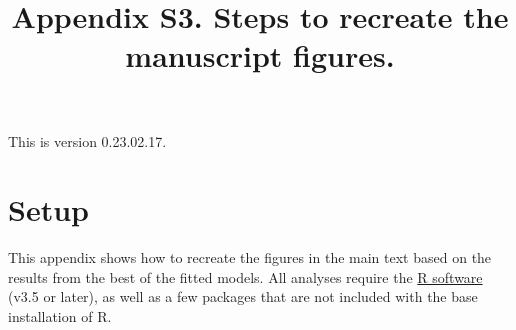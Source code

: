 \documentclass[
  11pt,
]{article}
\title{Appendix S3. Steps to recreate the manuscript figures.}
\author{}
\date{\vspace{-2.5em}}
\begin{document}
\maketitle

{
\setcounter{tocdepth}{3}
\tableofcontents
}
\vspace{0.2in}

This is version 0.23.02.17.

\newpage

\hypertarget{setup}{%
\section{Setup}\label{setup}}

This appendix shows how to recreate the figures in the main text based
on the results from the best of the fitted models. All analyses require
the \href{https://cran.r-project.org/}{R software} (v3.5 or later), as
well as a few packages that are not included with the base installation
of R.
\end{document}
